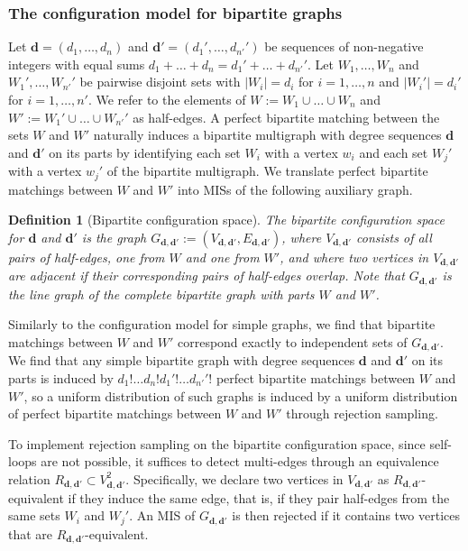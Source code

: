 \documentclass{article}
\theoremstyle{plain}
\theoremstyle{remark}
\theoremstyle{plain}
\newtheorem{definition}[theorem]{Definition}
\numberwithin{equation}{section}
\renewcommand{\d}{{\boldsymbol{d}}}
\begin{document}
	\subsubsection{The configuration model for bipartite graphs}\label{subsection_independent_bipartite}
	
	Let $\d=(d_1,\ldots,d_n)$ and $\d'=(d_1',\ldots,d_{n'}')$ be sequences of non-negative integers with equal sums $d_1+\ldots+d_n=d_1'+\ldots+d_{n'}'$. Let $W_1,\ldots,W_n$ and $W_1',\ldots,W_{n'}'$  be pairwise disjoint sets with $|W_i|=d_i$ for $i=1,\ldots,n$ and $|W_i'|=d_i'$ for $i=1,\ldots,n'$. We refer to the elements of $W:=W_1\cup\ldots\cup W_n$ and $W':=W_1'\cup\ldots\cup W_{n'}'$ as half-edges. A perfect bipartite matching between the sets $W$ and $W'$ naturally induces a bipartite multigraph with degree sequences $\d$ and $\d'$ on its parts by identifying each set $W_i$ with a vertex $w_i$ and each set $W_j'$ with a vertex $w_j'$ of the bipartite multigraph. We translate perfect bipartite matchings between $W$ and $W'$ into MISs of the following auxiliary graph.
	
	\begin{definition}[Bipartite configuration space]\label{definition_bispace}
		The \emph{bipartite configuration space} for $\d$ and $\d'$ is the graph $G_{\d,\d'}:=(V_{\d,\d'},E_{\d,\d'})$, where $V_{\d,\d'}$ consists of all pairs of half-edges, one from $W$ and one from $W'$, and where two vertices in $V_{\d,\d'}$ are adjacent if their corresponding pairs of half-edges overlap. Note that $G_{\d,\d'}$ is the line graph of the complete bipartite graph with parts $W$ and $W'$.
	\end{definition}
	
	Similarly to the configuration model for simple graphs, we find that bipartite matchings between $W$ and $W'$ correspond exactly to independent sets of $G_{\d,\d'}$. We find that any simple bipartite graph with degree sequences $\d$ and $\d'$ on its parts is induced by $d_1!\ldots d_n!d_1'!\ldots d_{n'}'!$ perfect bipartite matchings between $W$ and $W'$, so a uniform distribution of such graphs is induced by a uniform distribution of perfect bipartite matchings between $W$ and $W'$ through rejection sampling.
	
	To implement rejection sampling on the bipartite configuration space, since self-loops are not possible, it suffices to detect multi-edges through an equivalence relation $R_{\d,\d'}\subset V_{\d,\d'}^2$. Specifically, we declare two vertices in $V_{\d,\d'}$ as $R_{\d,\d'}$-equivalent if they induce the same edge, that is, if they pair half-edges from the same sets $W_i$ and $W_j'$. An MIS of $G_{\d,\d'}$ is then rejected if it contains two vertices that are $R_{\d,\d'}$-equivalent.
	
\end{document}
